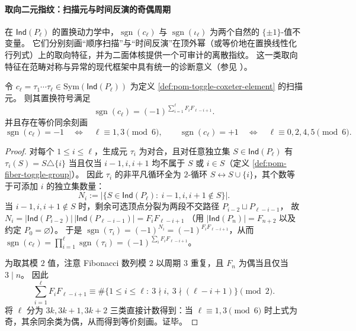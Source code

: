 \paragraph{取向二元指纹：扫描元与时间反演的奇偶周期}
在 \(\mathsf{Ind}(P_\ell)\) 的置换动力学中，\(\operatorname{sgn}(c_\ell)\) 与 \(\operatorname{sgn}(\iota_\ell)\) 为两个自然的 \(\{\pm 1\}\)-值不变量。
它们分别刻画“顺序扫描”与“时间反演”在顶外幂（或等价地在置换线性化行列式）上的取向特征，并为二面体核提供一个可审计的离散指纹。
这一类取向特征在范畴对称与异常的现代框架中具有统一的诊断意义（参见 \cite{Costa2024SimonsLecturesCategoricalSymmetries}）。

\begin{theorem}\label{thm:pom-toggle-scan-sign-mod6}
令 \(c_\ell=\tau_1\cdots\tau_\ell\in\mathrm{Sym}(\mathsf{Ind}(P_\ell))\) 为定义 \ref{def:pom-toggle-coxeter-element} 的扫描元。
则其置换符号满足
\[
\operatorname{sgn}(c_\ell)=(-1)^{\sum_{i=1}^{\ell}F_iF_{\ell-i+1}}.
\]
并且存在等价同余刻画
\[
\operatorname{sgn}(c_\ell)=-1\quad\Longleftrightarrow\quad \ell\equiv 1,3\pmod 6,
\qquad
\operatorname{sgn}(c_\ell)=+1\quad\Longleftrightarrow\quad \ell\equiv 0,2,4,5\pmod 6.
\]
\end{theorem}

\begin{proof}
对每个 \(1\le i\le \ell\)，生成元 \(\tau_i\) 为对合，且对任意独立集 \(S\in\mathsf{Ind}(P_\ell)\) 有 \(\tau_i(S)=S\triangle\{i\}\) 当且仅当 \(i-1,i,i+1\) 均不属于 \(S\) 或 \(i\in S\)（定义 \ref{def:pom-fiber-toggle-group}）。
因此 \(\tau_i\) 的非平凡循环全为 \(2\)-循环 \(S\leftrightarrow S\cup\{i\}\)，其个数等于可添加 \(i\) 的独立集数量：
\[
N_i:=\bigl|\{S\in\mathsf{Ind}(P_\ell):\ i-1,i,i+1\notin S\}\bigr|.
\]
当 \(i-1,i,i+1\notin S\) 时，剩余可选顶点分裂为两段不交路径
\(
P_{i-2}\sqcup P_{\ell-i-1}
\)，
故
\(
N_i=|\mathsf{Ind}(P_{i-2})|\,|\mathsf{Ind}(P_{\ell-i-1})|
=F_iF_{\ell-i+1}
\)
（用 \(|\mathsf{Ind}(P_n)|=F_{n+2}\) 以及约定 \(P_0=\varnothing\)）。
于是 \(\operatorname{sgn}(\tau_i)=(-1)^{N_i}=(-1)^{F_iF_{\ell-i+1}}\)，从而
\(
\operatorname{sgn}(c_\ell)=\prod_{i=1}^{\ell}\operatorname{sgn}(\tau_i)
=(-1)^{\sum_iF_iF_{\ell-i+1}}
\)。
\par
为取其模 \(2\) 值，注意 Fibonacci 数列模 \(2\) 以周期 \(3\) 重复，且 \(F_n\) 为偶当且仅当 \(3\mid n\)。
因此
\[
\sum_{i=1}^{\ell}F_iF_{\ell-i+1}\equiv
\#\{1\le i\le \ell:\ 3\nmid i,\ 3\nmid(\ell-i+1)\}\pmod 2.
\]
将 \(\ell\) 分为 \(3k,3k+1,3k+2\) 三类直接计数得到：当 \(\ell\equiv 1,3\pmod 6\) 时上式为奇，其余同余类为偶，从而得到等价刻画。证毕。
\end{proof}

